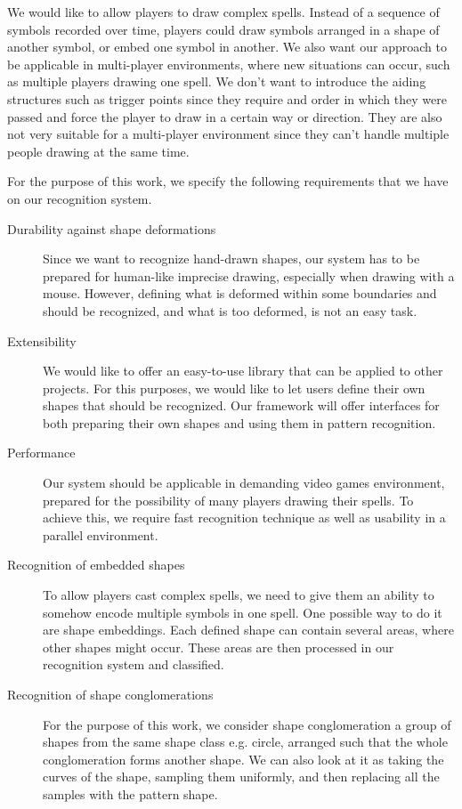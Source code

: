 We would like to allow players to draw complex spells. Instead of a sequence of symbols recorded over time, players could draw symbols arranged in a shape of another symbol, or embed one symbol in another. We also want our approach to be applicable in multi-player environments, where new situations can occur, such as multiple players drawing one spell. We don't want to introduce the aiding structures such as trigger points since they require and order in which they were passed and force the player to draw in a certain way or direction. They are also not very suitable for a multi-player environment since they can't handle multiple people drawing at the same time.

For the purpose of this work, we specify the following requirements that we have on our recognition system.
\begin{description}

\item [Durability against shape deformations]
Since we want to recognize hand-drawn shapes, our system has to be prepared for human-like imprecise drawing, especially when drawing with a mouse. However, defining what is deformed within some boundaries and should be recognized, and what is too deformed, is not an easy task.

\item [Extensibility]
We would like to offer an easy-to-use library that can be applied to other projects. For this purposes, we would like to let users define their own shapes that should be recognized. Our framework will offer interfaces for both preparing their own shapes and using them in pattern recognition.

\item [Performance]
Our system should be applicable in demanding video games environment, prepared for the possibility of many players drawing their spells. To achieve this, we require fast recognition technique as well as usability in a parallel environment. 

\item [Recognition of embedded shapes]
To allow players cast complex spells, we need to give them an ability to somehow encode multiple symbols in one spell. One possible way to do it are shape embeddings. Each defined shape can contain several areas, where other shapes might occur. These areas are then processed in our recognition system and classified.

\item [Recognition of shape conglomerations]
For the purpose of this work, we consider shape conglomeration a group of shapes from the same shape class e.g. circle, arranged such that the whole conglomeration forms another shape. We can also look at it as taking the curves of the shape, sampling them uniformly, and then replacing all the samples with the pattern shape.


\end{description}
